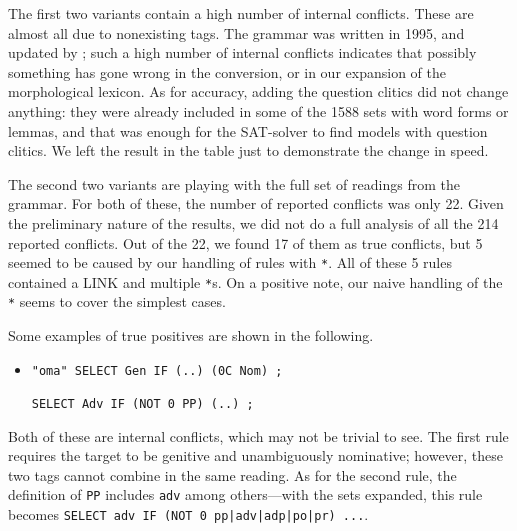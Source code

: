 The first two variants contain a high number of internal conflicts. 
These are almost all due to nonexisting tags. The grammar was written in 1995, and updated by ; such a high number of internal conflicts indicates that possibly something has gone wrong in the conversion, or in our expansion of the morphological lexicon.
As for accuracy, adding the question clitics did not change anything: they were already included in some of the 1588 sets with word forms or lemmas, and that was enough for the SAT-solver to find models with question clitics.
We left the result in the table just to demonstrate the change in speed.


The second two variants are playing with the full set of readings from the grammar. For both of these, the number of reported conflicts was only 22.
Given the preliminary nature of the results, we did not do a full analysis of all the 214 reported conflicts.
Out of the 22, we found 17 of them as true conflicts,
 but 5 seemed to be caused by our handling of rules with \verb!*!. 
All of these 5 rules contained a LINK and multiple \verb!*!s. On a positive note, our naive handling of the \verb!*! seems to cover the simplest cases.





Some examples of true positives are shown in the following.


\begin{itemize}
\item[]\begin{verbatim}
"oma" SELECT Gen IF (..) (0C Nom) ;

SELECT Adv IF (NOT 0 PP) (..) ;
\end{verbatim}
\end{itemize}

Both of these are internal conflicts, which may not be trivial to see.
The first rule requires the target to be genitive and unambiguously nominative; however, these two tags cannot combine in the same reading.
As for the second rule, the definition of \texttt{PP} includes \texttt{adv} among others---with the sets expanded, this rule becomes \texttt{SELECT adv IF (NOT 0 pp|adv|adp|po|pr) ...}.

